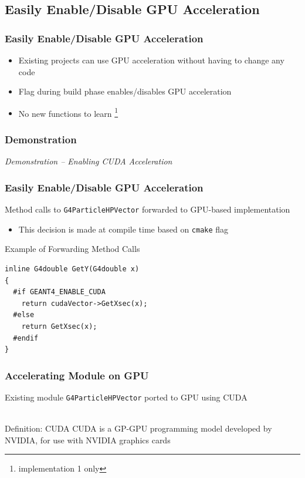 \documentclass{beamer}
\begin{document}
\subsection{Easily Enable/Disable GPU Acceleration}
\begin{frame}
\frametitle{Easily Enable/Disable GPU Acceleration}
\begin{itemize}
\item Existing projects can use GPU acceleration without having to change any code 
\item Flag during build phase enables/disables GPU acceleration
\item No new functions to learn \footnote{implementation 1 only}
\end{itemize}
\end{frame}

\begin{frame}
\frametitle{Demonstration}
\begin{center}
\emph{Demonstration -- Enabling CUDA Acceleration}
\end{center}
\end{frame}

\begin{frame}[fragile]
\frametitle{Easily Enable/Disable GPU Acceleration}
Method calls to \texttt{G4ParticleHPVector} forwarded to GPU-based implementation
\begin{itemize}
\item This decision is made at compile time based on \texttt{cmake} flag
\end{itemize}

\begin{block}{Example of Forwarding Method Calls}
\begin{lstlisting}
inline G4double GetY(G4double x)
{
  #if GEANT4_ENABLE_CUDA
    return cudaVector->GetXsec(x);
  #else
    return GetXsec(x);
  #endif
}
\end{lstlisting}
\end{block}
\end{frame}

\begin{frame}
\frametitle{Accelerating Module on GPU}
Existing module \texttt{G4ParticleHPVector} ported to GPU using CUDA\\~\\

\begin{block}{Definition: CUDA}
CUDA is a GP-GPU programming model developed by NVIDIA, for use with NVIDIA graphics cards
\end{block}
\end{frame}
\end{document}
